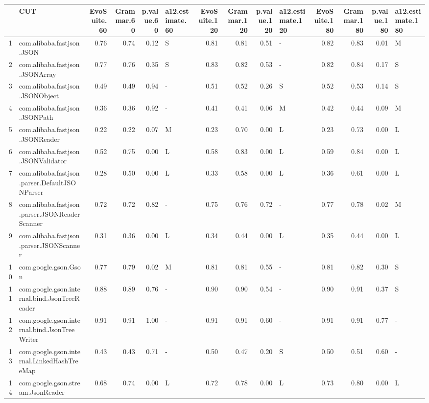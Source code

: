 \begin{table}[ht]
\centering
\begin{tabular}{rlrrrlrrrlrrrl}
  \hline
 & CUT & EvoSuite.60 & Grammar.60 & p.value.60 & a12.estimate.60 & EvoSuite.120 & Grammar.120 & p.value.120 & a12.estimate.120 & EvoSuite.180 & Grammar.180 & p.value.180 & a12.estimate.180 \\ 
  \hline
1 & com.alibaba.fastjson.JSON & 0.76 & 0.74 & 0.12 & S & 0.81 & 0.81 & 0.51 & - & 0.82 & 0.83 & 0.01 & M \\ 
  2 & com.alibaba.fastjson.JSONArray & 0.77 & 0.76 & 0.35 & S & 0.83 & 0.82 & 0.53 & - & 0.82 & 0.84 & 0.17 & S \\ 
  3 & com.alibaba.fastjson.JSONObject & 0.49 & 0.49 & 0.94 & - & 0.51 & 0.52 & 0.26 & S & 0.52 & 0.53 & 0.14 & S \\ 
  4 & com.alibaba.fastjson.JSONPath & 0.36 & 0.36 & 0.92 & - & 0.41 & 0.41 & 0.06 & M & 0.42 & 0.44 & 0.09 & M \\ 
  5 & com.alibaba.fastjson.JSONReader & 0.22 & 0.22 & 0.07 & M & 0.23 & 0.70 & 0.00 & L & 0.23 & 0.73 & 0.00 & L \\ 
  6 & com.alibaba.fastjson.JSONValidator & 0.52 & 0.75 & 0.00 & L & 0.58 & 0.83 & 0.00 & L & 0.59 & 0.84 & 0.00 & L \\ 
  7 & com.alibaba.fastjson.parser.DefaultJSONParser & 0.28 & 0.50 & 0.00 & L & 0.33 & 0.58 & 0.00 & L & 0.36 & 0.61 & 0.00 & L \\ 
  8 & com.alibaba.fastjson.parser.JSONReaderScanner & 0.72 & 0.72 & 0.82 & - & 0.75 & 0.76 & 0.72 & - & 0.77 & 0.78 & 0.02 & M \\ 
  9 & com.alibaba.fastjson.parser.JSONScanner & 0.31 & 0.36 & 0.00 & L & 0.34 & 0.44 & 0.00 & L & 0.35 & 0.44 & 0.00 & L \\ 
  10 & com.google.gson.Gson & 0.77 & 0.79 & 0.02 & M & 0.81 & 0.81 & 0.55 & - & 0.81 & 0.82 & 0.30 & S \\ 
  11 & com.google.gson.internal.bind.JsonTreeReader & 0.88 & 0.89 & 0.76 & - & 0.90 & 0.90 & 0.54 & - & 0.90 & 0.91 & 0.37 & S \\ 
  12 & com.google.gson.internal.bind.JsonTreeWriter & 0.91 & 0.91 & 1.00 & - & 0.91 & 0.91 & 0.60 & - & 0.91 & 0.91 & 0.77 & - \\ 
  13 & com.google.gson.internal.LinkedHashTreeMap & 0.43 & 0.43 & 0.71 & - & 0.50 & 0.47 & 0.20 & S & 0.50 & 0.51 & 0.60 & - \\ 
  14 & com.google.gson.stream.JsonReader & 0.68 & 0.74 & 0.00 & L & 0.72 & 0.78 & 0.00 & L & 0.73 & 0.80 & 0.00 & L \\ 

\end{tabular}
\end{table}
